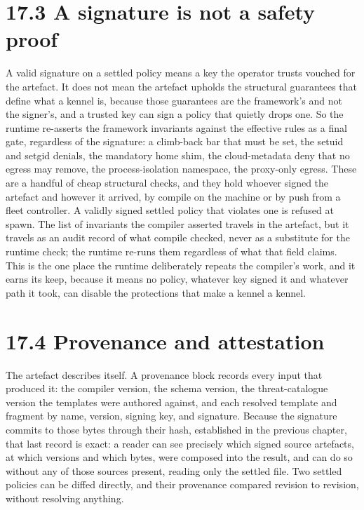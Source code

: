 \hypertarget{a-signature-is-not-a-safety-proof}{%
\section{17.3 A signature is not a safety
proof}\label{a-signature-is-not-a-safety-proof}}

A valid signature on a settled policy means a key the operator trusts
vouched for the artefact. It does not mean the artefact upholds the
structural guarantees that define what a kennel is, because those
guarantees are the framework's and not the signer's, and a trusted key
can sign a policy that quietly drops one. So the runtime re-asserts the
framework invariants against the effective rules as a final gate,
regardless of the signature: a climb-back bar that must be set, the
setuid and setgid denials, the mandatory home shim, the cloud-metadata
deny that no egress may remove, the process-isolation namespace, the
proxy-only egress. These are a handful of cheap structural checks, and
they hold whoever signed the artefact and however it arrived, by compile
on the machine or by push from a fleet controller. A validly signed
settled policy that violates one is refused at spawn. The list of
invariants the compiler asserted travels in the artefact, but it travels
as an audit record of what compile checked, never as a substitute for
the runtime check; the runtime re-runs them regardless of what that
field claims. This is the one place the runtime deliberately repeats the
compiler's work, and it earns its keep, because it means no policy,
whatever key signed it and whatever path it took, can disable the
protections that make a kennel a kennel.

\hypertarget{provenance-and-attestation}{%
\section{17.4 Provenance and
attestation}\label{provenance-and-attestation}}

The artefact describes itself. A provenance block records every input
that produced it: the compiler version, the schema version, the
threat-catalogue version the templates were authored against, and each
resolved template and fragment by name, version, signing key, and
signature. Because the signature commits to those bytes through their
hash, established in the previous chapter, that last record is exact: a
reader can see precisely which signed source artefacts, at which
versions and which bytes, were composed into the result, and can do so
without any of those sources present, reading only the settled file. Two
settled policies can be diffed directly, and their provenance compared
revision to revision, without resolving anything.

